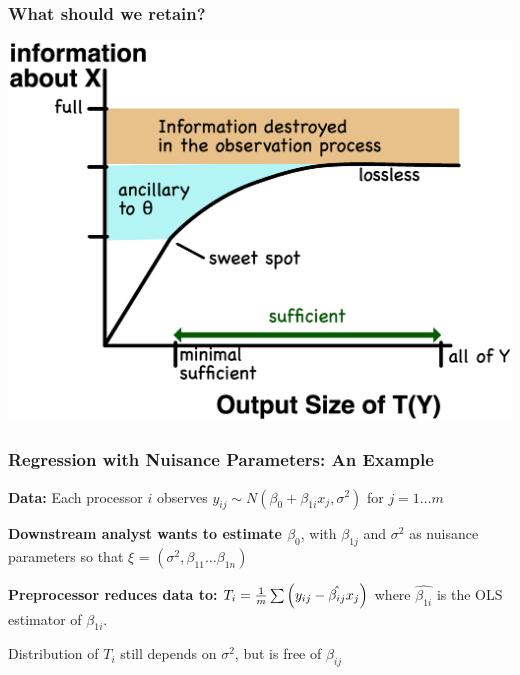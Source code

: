 \documentclass[10pt, compress]{beamer}
\begin{document}
\begin{frame}[fragile]
    \frametitle{What should we retain?}
    \includegraphics[width=\textwidth]{assets/information.eps}
\end{frame}


\begin{frame}[fragile]

    \frametitle{Regression with Nuisance Parameters: An Example}
    
    \vspace*{5mm}
    
    \textbf{Data:} Each processor $i$ observes $y_{ij} \sim N(\beta_0 + \beta_{1i}x_j, \sigma^2)$ for $j = 1 \ldots m$
    
    \vspace*{2mm}

    \textbf{Downstream analyst wants to estimate $\beta_0$}, with $\beta_{1j}$ and $\sigma^2$ as nuisance parameters so that $\xi$ = $(\sigma^2, \beta_{11} \ldots \beta_{1n})$
    
    \vspace*{2mm}

    \textbf{Preprocessor reduces data to:} $T_i = \frac{1}{m}\sum\del{y_{ij} - \hat{\beta_{ij}}x_j}$ where $\hat{\beta_{1i}}$ is the OLS estimator of $\beta_{1i}$.
    
    \vspace*{5mm}
    
    Distribution of $T_i$ still depends on $\sigma^2$, but is free of $\beta_{ij}$ 
\end{frame}
\end{document}
